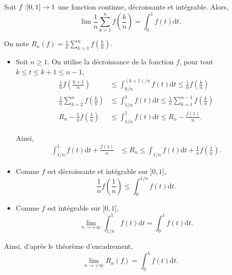 




\begin{exercice}
    Soit $f : ]0, 1] \to 1$ une fonction continue, décroissante et intégrable. Alors,
    \[
    \lim\limits \frac{1}{n} \sum\limits_{k=1}^n f\left(\frac{k}{n}\right) = \displaystyle\int_0^1 f(t) \mathrm{d}t.
    \]
\end{exercice}

\begin{elem_sol}
On note $R_n(f) = \frac{1}{n} \sum\limits_{k=1}^n f\left(\frac{k}{n}\right)$.
\begin{itemize}
\item Soit $n \geq 1$. On utilise la décroissance de la fonction $f$, pour tout $k \leq t \leq k + 1 \leq n-1$,
\begin{align*}
\frac{1}{n} f\left(\frac{k+1}{n}\right) &\leq \displaystyle\int_{k/n}^{(k+1)/n} f(t) \mathrm{d}t \leq \frac{1}{n} f\left(\frac{k}{n}\right)\\
\frac{1}{n} \sum\limits_{k=2}^{n} f\left(\frac{k}{n}\right) &\leq \displaystyle\int_{1/n}^1 f(t) \mathrm{d}t \leq \frac{1}{n} \sum\limits_{k=1}^{n-1} f\left(\frac{k}{n}\right)\\
R_n - \frac{1}{n} f\left(\frac{1}{n}\right) &\leq \displaystyle\int_{1/n}^1 f(t) \mathrm{d}t \leq R_n - \frac{f(1)}{n}.
\end{align*}

Ainsi,
\begin{align*}
\displaystyle\int_{1/n}^1 f(t) \mathrm{d}t + \frac{f(1)}{n} &\leq R_n \leq \displaystyle\int_{1/n} f(t) \mathrm{d}t + \frac{1}{n}  f\left(\frac{1}{n}\right).
\end{align*}

\item Comme $f$ est décroissante et intégrable sur $]0, 1]$,
\[
\frac{1}{n} f\left(\frac{1}{n}\right) \leq \displaystyle\int_0^{1/n} f(t) \mathrm{d}t.
\]

\item Comme $f$ est intégrable sur $]0, 1]$,
\[
\lim\limits_{n\to+\infty} \displaystyle\int_{1/n}^1 f(t) \mathrm{d}t = \displaystyle\int_0^1 f(t) \mathrm{d}t.
\]
\end{itemize}

Ainsi, d'après le théorème d'encadrement,
\[
\lim\limits_{n\to+\infty} R_n(f) = \displaystyle\int_0^1 f(t) \mathrm{d}t.
\]
\end{elem_sol}

